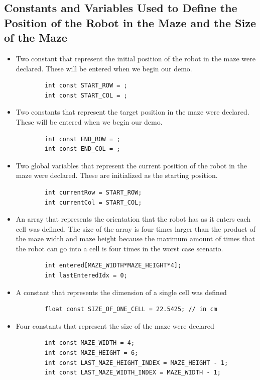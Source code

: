 \documentclass[11pt]{article}
\begin{document}
\subsection{Constants and Variables Used to Define the Position of the Robot in the Maze and the Size of the Maze}
\begin{itemize}
\item Two constant that represent the initial position of the robot in the maze were declared. These will be entered when we begin our demo.
	\begin{verbatim}
		int const START_ROW = ;
		int const START_COL = ;
	\end{verbatim} 
\item Two constants that represent the target position in the maze were declared. These will be entered when we begin our demo.
	\begin{verbatim}
		int const END_ROW = ; 
		int const END_COL = ;
	\end{verbatim}
\item Two global variables that represent the current position of the robot in the maze were declared. These are initialized as the starting position. 
	\begin{verbatim}
		int currentRow = START_ROW;
		int currentCol = START_COL;
	\end{verbatim} 
\item An array that represents the orientation that the robot has as it enters each cell was defined. The size of the array is four times larger than the product of the maze width and maze height because the maximum amount of times that the robot can go into a cell is four times in the worst case scenario.
	\begin{verbatim}
		int entered[MAZE_WIDTH*MAZE_HEIGHT*4];
		int lastEnteredIdx = 0;
	\end{verbatim} 
\item A constant that represents the dimension of a single cell was defined
	\begin{verbatim}
		float const SIZE_OF_ONE_CELL = 22.5425; // in cm 	
	\end{verbatim} 
\item Four constants that represent the size of the maze were declared
	\begin{verbatim}
		int const MAZE_WIDTH = 4;
		int const MAZE_HEIGHT = 6;
		int const LAST_MAZE_HEIGHT_INDEX = MAZE_HEIGHT - 1;
		int const LAST_MAZE_WIDTH_INDEX = MAZE_WIDTH - 1;
	\end{verbatim} 
\end{itemize}
\newpage
\end{document}
